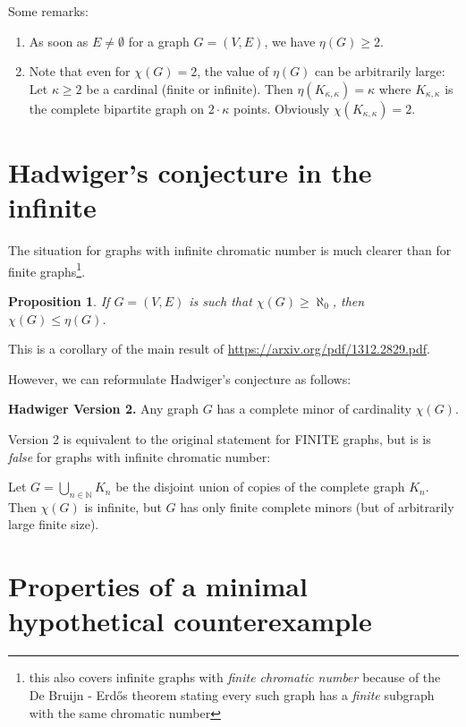 \documentclass[12pt, a4paper]{amsart}
\newtheorem{proposition}[lemma]{\bf Proposition}
\begin{document}
Some remarks:

\begin{enumerate}
\item As soon as $E \neq \emptyset$ for a graph $G=(V,E)$,
	we have $\eta(G) \geq 2.$
\item Note that even for $\chi(G)=2$, the value of $\eta(G)$ can 
	be arbitrarily large: Let $\kappa\geq 2$ be a cardinal (finite
		or infinite). Then $\eta(K_{\kappa,\kappa}) = \kappa$
		where $K_{\kappa, \kappa}$ is the complete bipartite
		graph on $2\cdot \kappa$ points. Obviously
		$\chi(K_{\kappa,\kappa}) = 2$.
\end{enumerate}

\section{Hadwiger's conjecture in the infinite}
The situation for graphs with infinite chromatic number is much
clearer than for finite graphs\footnote{this also covers infinite graphs 
with {\em finite chromatic number} because of the De Bruijn - Erd\H{o}s
theorem stating every such graph has a {\em finite} subgraph
with the same chromatic number}.
\begin{proposition} If $G=(V,E)$ is such that $\chi(G)\geq \aleph_0$, 
	then $\chi(G)\leq \eta(G)$.
\end{proposition}
This is a corollary of the main result of 
\url{https://arxiv.org/pdf/1312.2829.pdf}.

However, we can reformulate Hadwiger's conjecture as follows:

{\bf Hadwiger Version 2.} Any graph $G$ has a complete minor of 
cardinality $\chi(G)$.

Version 2 is equivalent to the original statement for FINITE graphs,
but is is {\em false} for graphs with infinite chromatic number:

Let $G = \bigcup_{n\in \mathbb{N}}K_n$ be the disjoint union of copies of
the complete graph $K_n$. Then $\chi(G)$ is infinite, but $G$ has
only finite complete minors (but of arbitrarily large finite size).

\section{Properties of a minimal hypothetical counterexample}
\end{document}
